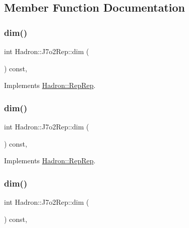 \subsection{Member Function Documentation}
\mbox{\label{structHadron_1_1J7o2Rep_a0134ed51bb5cad59f0a552c5bc472765}} 
\subsubsection{\texorpdfstring{dim()}{dim()}\hspace{0.1cm}{\footnotesize\ttfamily [1/5]}}
{\footnotesize\ttfamily int Hadron\+::\+J7o2\+Rep\+::dim (\begin{DoxyParamCaption}{ }\end{DoxyParamCaption}) const\hspace{0.3cm}{\ttfamily [inline]}, {\ttfamily [virtual]}}



Implements \mbox{\hyperlink{structHadron_1_1RepRep_a92c8802e5ed7afd7da43ccfd5b7cd92b}{Hadron\+::\+Rep\+Rep}}.

\mbox{\label{structHadron_1_1J7o2Rep_a0134ed51bb5cad59f0a552c5bc472765}} 
\subsubsection{\texorpdfstring{dim()}{dim()}\hspace{0.1cm}{\footnotesize\ttfamily [2/5]}}
{\footnotesize\ttfamily int Hadron\+::\+J7o2\+Rep\+::dim (\begin{DoxyParamCaption}{ }\end{DoxyParamCaption}) const\hspace{0.3cm}{\ttfamily [inline]}, {\ttfamily [virtual]}}



Implements \mbox{\hyperlink{structHadron_1_1RepRep_a92c8802e5ed7afd7da43ccfd5b7cd92b}{Hadron\+::\+Rep\+Rep}}.

\mbox{\label{structHadron_1_1J7o2Rep_a0134ed51bb5cad59f0a552c5bc472765}} 
\subsubsection{\texorpdfstring{dim()}{dim()}\hspace{0.1cm}{\footnotesize\ttfamily [3/5]}}
{\footnotesize\ttfamily int Hadron\+::\+J7o2\+Rep\+::dim (\begin{DoxyParamCaption}{ }\end{DoxyParamCaption}) const\hspace{0.3cm}{\ttfamily [inline]}, {\ttfamily [virtual]}}



